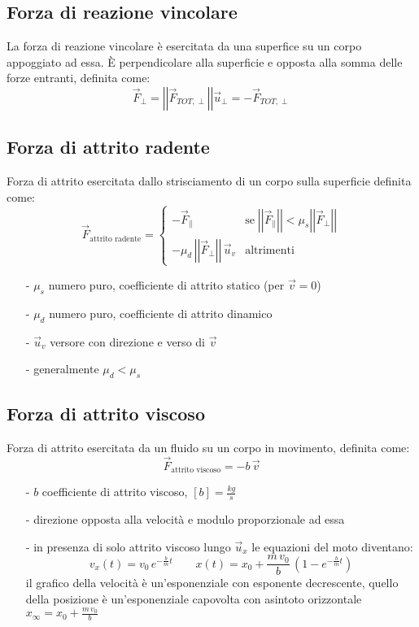 \documentclass[a4paper]{article}
\newcommand\ux{\vec{u}_x}
\newcommand\uper{\vec{u}_\perp}
\newcommand\vmod[1]{\left|\left|{#1}\right|\right|}
\begin{document}
\subsection{Forza di reazione vincolare}
La forza di reazione vincolare è esercitata da una superfice su un corpo appoggiato ad essa. È perpendicolare alla superficie e
opposta alla somma delle forze entranti, definita come:
\[\vec{F}_\perp = \vmod{\vec{F}_{TOT,\perp}} \uper = -\vec{F}_{TOT,\perp}\]

\subsection{Forza di attrito radente}
Forza di attrito esercitata dallo strisciamento di un corpo sulla superficie definita come:
\[\vec{F}_\text{attrito radente} = \begin{cases}
	-\vec{F}_{\parallel} &\text{se} \; \vmod{\vec{F}_\parallel} < \mu_s \vmod{\vec{F}_\perp}\\
	-\mu_d \, \vmod{\vec{F}_\perp} \, \vec{u}_v &\text{altrimenti}
\end{cases}\]

\begin{itemize}[topsep=3pt, itemsep=0pt]
	\item[-] \(\mu_s\) numero puro, coefficiente di attrito statico (per \(\vec{v}=0\))
	\item[-] \(\mu_d\) numero puro, coefficiente di attrito dinamico
	\item[-] \(\vec{u}_v\) versore con direzione e verso di \(\vec{v}\)
	\item[-] generalmente \(\mu_d < \mu_s\)
\end{itemize}

\subsection{Forza di attrito viscoso}
Forza di attrito esercitata da un fluido su un corpo in movimento, definita come:
\[\vec{F}_\text{attrito viscoso} = - b \, \vec{v}\]
\begin{itemize}[topsep=3pt, itemsep=0pt]
	\item[-] \(b\) coefficiente di attrito viscoso, \(\left[b\right] = \frac{kg}{s}\)
	\item[-] direzione opposta alla velocità e modulo proporzionale ad essa
	\item[-] in presenza di solo attrito viscoso lungo \(\ux\) le equazioni del moto diventano:
	\[v_x(t) = v_0 \, e^{-\frac{b}{m}t} \qquad x(t) = x_0 + \frac{m \, v_0}{b} \, \left(1-e^{-\frac{b}{m}t}\right)\]
	il grafico della velocità è un'esponenziale con esponente decrescente, quello della posizione è un'esponenziale capovolta con asintoto orizzontale \(x_{\infty} = x_0 + \frac{m \, v_0}{b}\)
\end{itemize}
\end{document}
